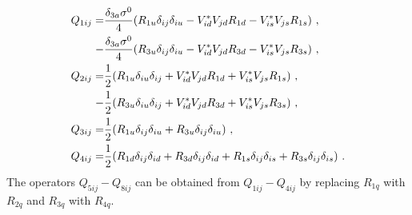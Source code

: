 \begin{align}\label{eq:dependenciesoperators}
	Q_{1ij} =&\frac{\delta_{3a}\sigma^0}{4}(R_{1u}\delta_{ij}\delta_{iu} - V_{id}^*V_{jd}R_{1d} - V_{is}^*V_{js}R_{1s}) \ , \notag \\
	-&\frac{\delta_{3a}\sigma^0}{4} (R_{3u}\delta_{ij}\delta_{iu} - V_{id}^*V_{jd}R_{3d} - V_{is}^*V_{js}R_{3s}) \ , \notag \\
	Q_{2ij} =&\frac{1}{2}(R_{1u}\delta_{iu}\delta_{ij}+ V_{id}^*V_{jd}R_{1d}+ V_{is}^*V_{js}R_{1s}) \ , \notag \\
	-&\frac{1}{2}(R_{3u}\delta_{iu}\delta_{ij} + V_{id}^*V_{jd}R_{3d} + V_{is}^*V_{js}R_{3s}) \ , \notag \\
	Q_{3ij} =&\frac{1}{2}(R_{1u}\delta_{ij}\delta_{iu} + R_{3u}\delta_{ij}\delta_{iu}) \ , \notag \\
	Q_{4ij} =&\frac{1}{2}(R_{1d}\delta_{ij}\delta_{id} + R_{3d}\delta_{ij}\delta_{id} + R_{1s}\delta_{ij}\delta_{is} + R_{3s}\delta_{ij}\delta_{is}) \ .
\end{align}
The operators $Q_{5ij}-Q_{8ij}$ can be obtained from $Q_{1ij}-Q_{4ij}$ by replacing $R_{1q}$ with $R_{2q}$ and $R_{3q}$ with $R_{4q}$.


